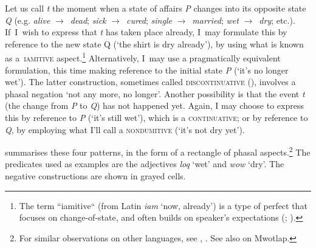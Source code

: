 \documentclass[output=paper,colorlinks,citecolor=brown,draft]{langscibook}
\begin{document}
Let us call \textit{t} the moment when a state of affairs \textit{P} changes into its opposite state \textit{Q} (e.g. \textit{alive} \textrm{${\rightarrow}$}~\textit{dead}; \textit{sick} \textrm{${\rightarrow}$}~\textit{cured}; \textit{single} \textrm{${\rightarrow}$}~\textit{married}; \textit{wet} \textrm{${\rightarrow}$}~\textit{dry}; etc.). If~I~wish to express that \textit{t} has taken place already, I~may formulate this by reference to the new state Q (‘the shirt is dry already’), by using what is known as a~\textsc{iamitive} \mbox{aspect}.\footnote{The term “iamitive“ (from Latin \textit{iam} ‘now, already’) is a type of perfect that focuses on change-of-state, and often builds on speaker’s expectations (\citealt{Olsson2013}; \citealt{DahlWälchli2016}).} Alternatively, I~may use a pragmatically equivalent formulation, this time making reference to the initial state \textit{P} (‘it’s no longer wet’). The latter construction, sometimes called \textsc{discontinuative} (\citealt[44]{Auwera1998}), involves a phasal negation ‘not any more, no longer’.
Another possibility is that the event \textit{t} (the change from \textit{P} to \textit{Q}) has not happened yet. Again, I may choose to express this by reference to \textit{P} (‘it’s still wet’), which is a \textsc{continuative}; or by reference to \textit{Q}, by employing what I’ll call a \textsc{nondumitive} (‘it’s not dry yet’).

 summarises these four patterns, in the form of a rectangle of phasal aspects.\footnote{For similar observations on other languages, see \citet{Löbner1989}, \citet{Krifka2000}. See also \citet[325]{François2003} on Mwotlap.}  The predicates used as examples are the adjectives \textit{loq} ‘wet’ and \textit{wow} ‘dry’. The negative constructions are shown in grayed cells.
\end{document}
